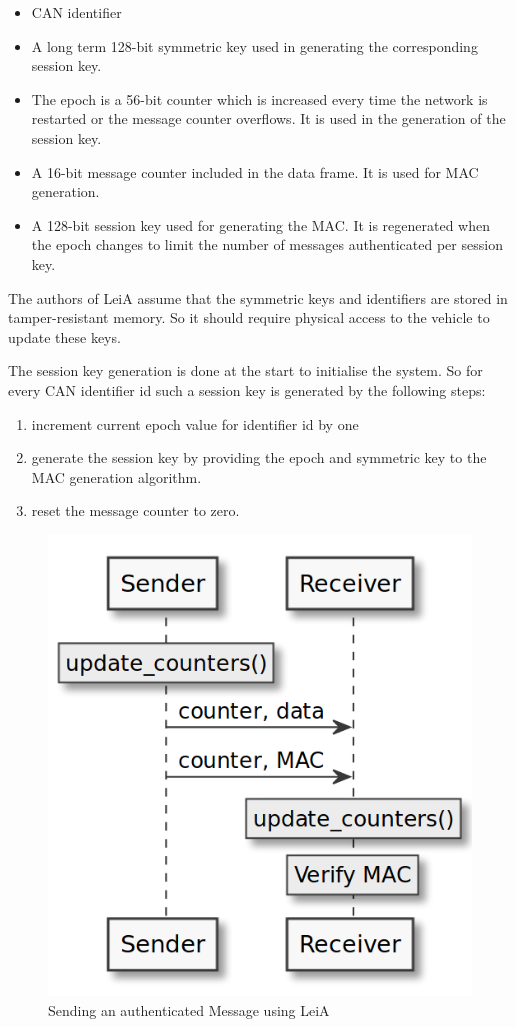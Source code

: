 \begin{itemize}
    \item CAN identifier
    \item A long term 128-bit symmetric key used in generating the corresponding
    session key.
    \item The epoch is a 56-bit counter which is increased every time the
    network is restarted or the message counter overflows. It is used in the
    generation of the session key.
    \item A 16-bit message counter included in the data frame. It is used for
    MAC generation.
    \item A 128-bit session key used for generating the MAC. It is regenerated
    when the epoch changes to limit the number of messages authenticated per
    session key.
\end{itemize}

The authors of LeiA assume that the symmetric keys and identifiers are stored in
tamper-resistant memory. So it should require physical access to the vehicle to
update these keys.

The session key generation is done at the start to initialise the system. So for
every CAN identifier id such a session key is generated by the following steps:

\begin{enumerate}
    \item increment current epoch value for identifier id by one
    \item generate the session key by providing the epoch and symmetric key to
    the MAC generation algorithm.
    \item reset the message counter to zero.
\end{enumerate}

\begin{figure}[h]
    \centering
    \captionsetup{justification=centering}
	\includegraphics[width=0.6\linewidth]{Figures/LeiA_sending_msg.png}
	\caption[]{Sending an authenticated Message using LeiA}
	\label{fig:leia_sending_msg}
\end{figure}

